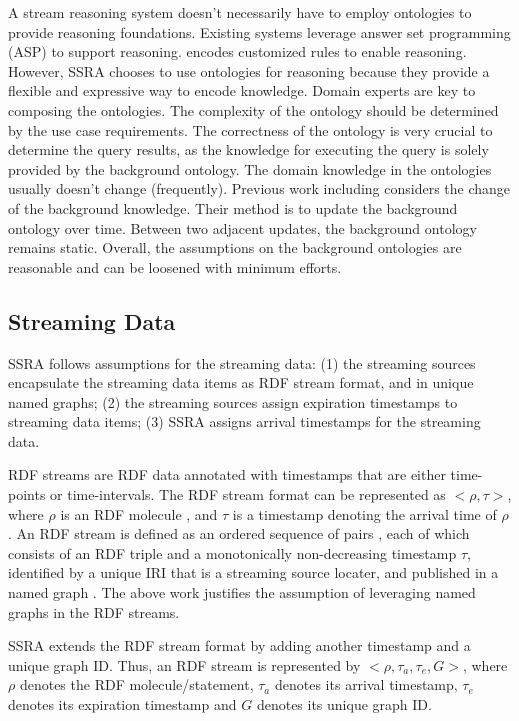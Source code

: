 A stream reasoning system doesn't necessarily have to employ ontologies to provide reasoning foundations. 
Existing systems \cite{do2011answer} \cite{gebser2012stream} leverage answer set programming (ASP) \cite{gelfond1991classical} to support reasoning.
\cite{mileo2013streamrule} encodes customized rules to enable reasoning.   
However, SSRA chooses to use ontologies for reasoning because they provide a flexible and expressive way to encode knowledge. 
Domain experts are key to composing the ontologies. 
The complexity of the ontology should be determined by the use case requirements. 
The correctness of the ontology is very crucial to determine the query results, as the knowledge for executing the query is solely provided by the background ontology. 
The domain knowledge in the ontologies usually doesn't change (frequently). 
Previous work including \cite{gao2016planning} \cite{ren2010towards} considers the change of the background knowledge.
Their method is to update the background ontology over time.
Between two adjacent updates, the background ontology remains static.
Overall, the assumptions on the background ontologies are reasonable and can be loosened with minimum efforts. 
%
\subsection{Streaming Data}
SSRA follows assumptions for the streaming data: 
(1) the streaming sources encapsulate the streaming data items as RDF stream format, and in unique named graphs;
(2) the streaming sources assign expiration timestamps to streaming data items;
(3) SSRA assigns arrival timestamps for the streaming data.

RDF streams \cite{della2009first} are RDF data annotated with timestamps that are either time-points or time-intervals.
The RDF stream format can be represented as $<\rho, \tau>$, where $\rho$ is an RDF molecule \cite{ding2005tracking}, and $\tau$ is a timestamp denoting the arrival time of $\rho$.
An RDF stream is defined as an ordered sequence of pairs \cite{barbieri2010proposal} \cite{barbieri2009c}, each of which consists of an RDF triple and a monotonically non-decreasing timestamp $\tau$, identified by a unique IRI that is a streaming source locater, and published in a named graph \cite{carroll2005named}.
The above work justifies the assumption of leveraging named graphs in the RDF streams. 

SSRA extends the RDF stream format by adding another timestamp and a unique graph ID.
Thus, an RDF stream is represented by $<\rho,\tau_{a}, \tau_{e}, G>$, where $\rho$ denotes the RDF molecule/statement, $\tau_{a}$ denotes its arrival timestamp, $\tau_{e}$ denotes its expiration timestamp and $G$ denotes its unique graph ID.

